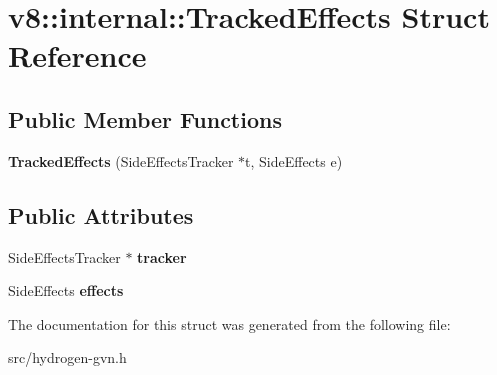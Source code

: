 \hypertarget{structv8_1_1internal_1_1_tracked_effects}{}\section{v8\+:\+:internal\+:\+:Tracked\+Effects Struct Reference}
\label{structv8_1_1internal_1_1_tracked_effects}
\subsection*{Public Member Functions}
\begin{DoxyCompactItemize}
\item 
\hypertarget{structv8_1_1internal_1_1_tracked_effects_ac879e606f973dd621860741abbe673d5}{}{\bfseries Tracked\+Effects} (Side\+Effects\+Tracker $\ast$t, Side\+Effects e)\label{structv8_1_1internal_1_1_tracked_effects_ac879e606f973dd621860741abbe673d5}

\end{DoxyCompactItemize}
\subsection*{Public Attributes}
\begin{DoxyCompactItemize}
\item 
\hypertarget{structv8_1_1internal_1_1_tracked_effects_a69e0f2436c6018eb292a3eedc0f382e7}{}Side\+Effects\+Tracker $\ast$ {\bfseries tracker}\label{structv8_1_1internal_1_1_tracked_effects_a69e0f2436c6018eb292a3eedc0f382e7}

\item 
\hypertarget{structv8_1_1internal_1_1_tracked_effects_a746806e15b28a33b79c66e8ff855f090}{}Side\+Effects {\bfseries effects}\label{structv8_1_1internal_1_1_tracked_effects_a746806e15b28a33b79c66e8ff855f090}

\end{DoxyCompactItemize}


The documentation for this struct was generated from the following file\+:\begin{DoxyCompactItemize}
\item 
src/hydrogen-\/gvn.\+h\end{DoxyCompactItemize}
